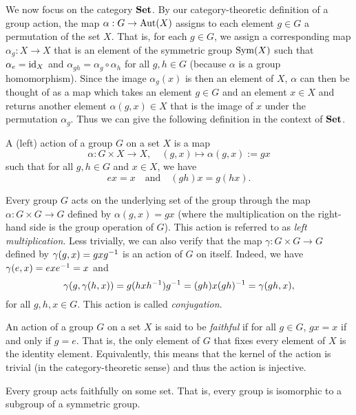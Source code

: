 We now focus on the category \(\mathbf{Set}\). By our category-theoretic definition of a
group action, the map \(\alpha: G \to \operatorname{Aut}(X)\) assigns to each element \(g \in
G\) a permutation of the set \(X\). That is, for each \(g \in G\), we assign a
corresponding map \(\alpha_g : X \to X\) that is an element of the symmetric
group \(\operatorname{Sym}(X)\) such that \(\alpha_e = \operatorname{id}_X\) and \(\alpha_{gh} = \alpha_g
\circ \alpha_h\) for all \(g, h \in G\) (because \(\alpha\) is a group
homomorphism). Since the image \(\alpha_g(x)\) is then an element of \(X\),
\(\alpha\) can then be thought of as a map which takes an element \(g \in G\)
and an element \(x \in X\) and returns another element \(\alpha(g, x) \in X\)
that is the image of \(x\) under the permutation \(\alpha_g\). Thus we can give
the following definition in the context of \(\mathbf{Set}\).

\begin{definition}
    A (left) action of a group \(G\) on a set \(X\) is a map
    \[
        \alpha: G \times X \to X, \quad (g, x) \mapsto \alpha(g, x) := gx
    \]
    such that for all \(g, h \in G\) and \(x \in X\), we have
    \[
        e x = x \quad \text{and} \quad (gh)x = g(hx).
    \]
\end{definition}

\begin{example}
    Every group \(G\) acts on the underlying set of the group through the map
    \(\alpha: G \times G \to G\) defined by \(\alpha(g, x) = gx\) (where the
    multiplication on the right-hand side is the group operation of \(G\)). This
    action is referred to as \emph{left multiplication}. Less trivially, we can
    also verify that the map \(\gamma: G \times G \to G\) defined by \(
    \gamma(g, x) = gxg^{-1}\) is an action of \(G\) on itself. Indeed, we have
    \(\gamma(e, x) = exe^{-1} = x\) and
    \[
        \gamma(g, \gamma(h, x)) = g(hxh^{-1})g^{-1} = (gh)x(gh)^{-1} = \gamma(gh, x),
    \]
    for all \(g, h, x \in G\). This action is called \emph{conjugation}.
\end{example}

An action of a group \(G\) on a set \(X\) is said to be \emph{faithful} if for
all \(g \in G\), \(gx = x\) if and only if \(g = e\). That is, the only element
of \(G\) that fixes every element of \(X\) is the identity element.
Equivalently, this means that the kernel of the action is trivial (in the
category-theoretic sense) and thus the action is injective.

\begin{theorem}
    Every group acts faithfully on some set. That is, every group is isomorphic
    to a subgroup of a symmetric group.
\end{theorem}

